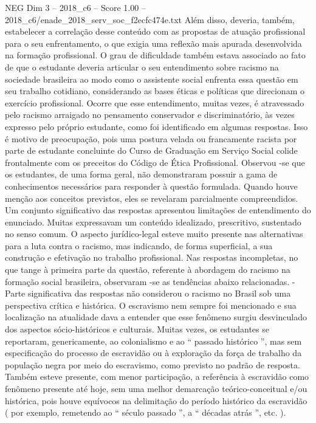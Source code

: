 \begin{textsample}{NEG Dim 3 – 2018\_c6 – Score 1.00 – 2018\_c6/enade\_2018\_serv\_soc\_f2ecfc474e.txt}
Além disso, deveria, também, estabelecer a correlação desse conteúdo com as propostas de atuação profissional para o seu enfrentamento, o que exigia uma reflexão mais apurada desenvolvida na formação profissional.
O grau de dificuldade também estava associado ao fato de que o estudante deveria articular o seu entendimento sobre racismo na sociedade brasileira ao modo como o assistente social enfrenta essa questão em seu trabalho cotidiano, considerando as bases éticas e políticas que direcionam o exercício profissional.
Ocorre que esse entendimento, muitas vezes, é atravessado pelo racismo arraigado no pensamento conservador e discriminatório, às vezes expresso pelo próprio estudante, como foi identificado em algumas respostas.
Isso é motivo de preocupação, pois uma postura velada ou francamente racista por parte de estudante concluinte do Curso de Graduação em Serviço Social colide frontalmente com os preceitos do Código de Ética Profissional.
Observou -se que os estudantes, de uma forma geral, não demonstraram possuir a gama de conhecimentos necessários para responder à questão formulada.
Quando houve menção aos conceitos previstos, eles se revelaram parcialmente compreendidos.
Um conjunto significativo das respostas apresentou limitações de entendimento do enunciado.
Muitas expressavam um conteúdo idealizado, prescritivo, sustentado no senso comum.
O aspecto jurídico-legal esteve muito presente nas alternativas para a luta contra o racismo, mas indicando, de forma superficial, a sua construção e efetivação no trabalho profissional.
Nas respostas incompletas, no que tange à primeira parte da questão, referente à abordagem do racismo na formação social brasileira, observaram -se as tendências abaixo relacionadas. - Parte significativa das respostas não considerou o racismo no Brasil sob uma perspectiva crítica e histórica.
O escravismo nem sempre foi mencionado e sua localização na atualidade dava a entender que esse fenômeno surgiu desvinculado dos aspectos sócio-históricos e culturais.
Muitas vezes, os estudantes se reportaram, genericamente, ao colonialismo e ao “ passado histórico ”, mas sem especificação do processo de escravidão ou à exploração da força de trabalho da população negra por meio do escravismo, como previsto no padrão de resposta.
Também esteve presente, com menor participação, a referência à escravidão como fenômeno presente até hoje, sem uma melhor demarcação teórico-conceitual e/ou histórica, pois houve equívocos na delimitação do período histórico da escravidão ( por exemplo, remetendo ao “ século passado ”, a “ décadas atrás ”, etc. ).

\end{textsample}
